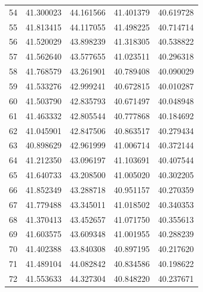 \begin{table}
\begin{tabular}{rrrrr}
54 & 41.300023 & 44.161566 & 41.401379 & 40.619728 \\
55 & 41.813415 & 44.117055 & 41.498225 & 40.714714 \\
56 & 41.520029 & 43.898239 & 41.318305 & 40.538822 \\
57 & 41.562640 & 43.577655 & 41.023511 & 40.296318 \\
58 & 41.768579 & 43.261901 & 40.789408 & 40.090029 \\
59 & 41.533276 & 42.999241 & 40.672815 & 40.010287 \\
60 & 41.503790 & 42.835793 & 40.671497 & 40.048948 \\
61 & 41.463332 & 42.805544 & 40.777868 & 40.184692 \\
62 & 41.045901 & 42.847506 & 40.863517 & 40.279434 \\
63 & 40.898629 & 42.961999 & 41.006714 & 40.372144 \\
64 & 41.212350 & 43.096197 & 41.103691 & 40.407544 \\
65 & 41.640733 & 43.208500 & 41.005020 & 40.302205 \\
66 & 41.852349 & 43.288718 & 40.951157 & 40.270359 \\
67 & 41.779488 & 43.345011 & 41.018502 & 40.340353 \\
68 & 41.370413 & 43.452657 & 41.071750 & 40.355613 \\
69 & 41.603575 & 43.609348 & 41.001955 & 40.288239 \\
70 & 41.402388 & 43.840308 & 40.897195 & 40.217620 \\
71 & 41.489104 & 44.082842 & 40.834586 & 40.198622 \\
72 & 41.553633 & 44.327304 & 40.848220 & 40.237671 \\
\bottomrule
\end{tabular}
\end{table}
